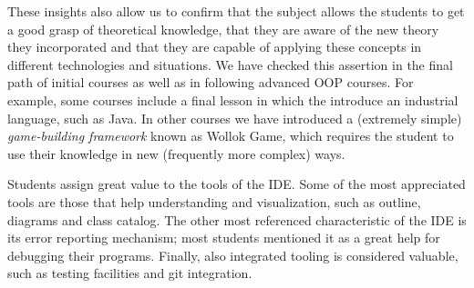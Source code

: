 
These insights also allow us to confirm that the subject allows the students to get a good grasp of theoretical knowledge, 
that they are aware of the new theory they incorporated
and that they are capable of applying these concepts in different technologies and situations.
We have checked this assertion in the final path of initial courses as well as in following advanced OOP courses.
For example, some courses include a final lesson in which the introduce an industrial language, such as Java.
In other courses we have introduced a (extremely simple) \emph{game-building framework} known as Wollok Game,
which requires the student to use their knowledge in new (frequently more complex) ways.

Students assign great value to the tools of the IDE.
Some of the most appreciated tools are those that help understanding and visualization, 
such as outline, diagrams and class catalog.
The other most referenced characteristic of the IDE is its error reporting mechanism;
most students mentioned it as a great help for debugging their programs.
Finally, also integrated tooling is considered valuable, 
such as testing facilities and git integration.





